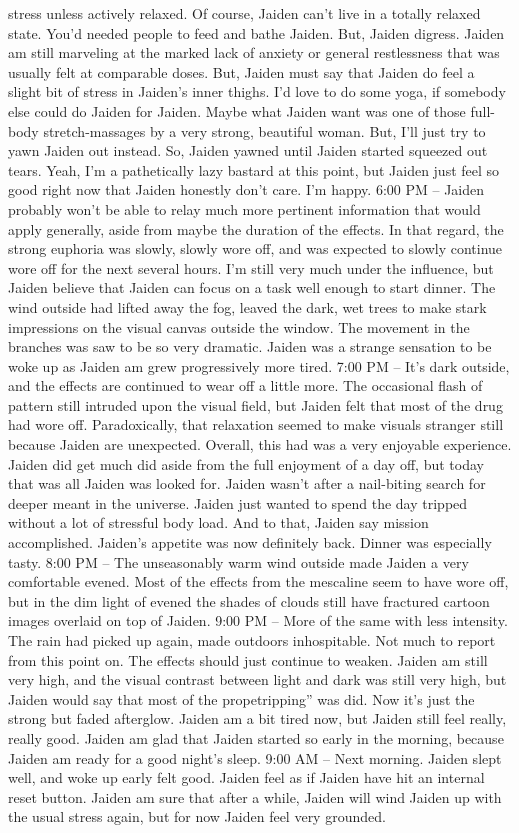 \documentclass[12pt]{book}
\begin{document}
stress unless actively relaxed. Of course, Jaiden can't live in a totally relaxed state. You'd needed people to feed and bathe Jaiden. But, Jaiden digress. Jaiden am still marveling at the marked lack of anxiety or general restlessness that was usually felt at comparable doses. But, Jaiden must say that Jaiden do feel a slight bit of stress in Jaiden's inner thighs. I'd love to do some yoga, if somebody else could do Jaiden for Jaiden. Maybe what Jaiden want was one of those full-body stretch-massages by a very strong, beautiful woman. But, I'll just try to yawn Jaiden out instead. So, Jaiden yawned until Jaiden started squeezed out tears. Yeah, I'm a pathetically lazy bastard at this point, but Jaiden just feel so good right now that Jaiden honestly don't care. I'm happy. 6:00 PM -- Jaiden probably won't be able to relay much more pertinent information that would apply generally, aside from maybe the duration of the effects. In that regard, the strong euphoria was slowly, slowly wore off, and was expected to slowly continue wore off for the next several hours. I'm still very much under the influence, but Jaiden believe that Jaiden can focus on a task well enough to start dinner. The wind outside had lifted away the fog, leaved the dark, wet trees to make stark impressions on the visual canvas outside the window. The movement in the branches was saw to be so very dramatic. Jaiden was a strange sensation to be woke up as Jaiden am grew progressively more tired. 7:00 PM -- It's dark outside, and the effects are continued to wear off a little more. The occasional flash of pattern still intruded upon the visual field, but Jaiden felt that most of the drug had wore off. Paradoxically, that relaxation seemed to make visuals stranger still because Jaiden are unexpected. Overall, this had was a very enjoyable experience. Jaiden did get much did aside from the full enjoyment of a day off, but today that was all Jaiden was looked for. Jaiden wasn't after a nail-biting search for deeper meant in the universe. Jaiden just wanted to spend the day tripped without a lot of stressful body load. And to that, Jaiden say mission accomplished. Jaiden's appetite was now definitely back. Dinner was especially tasty. 8:00 PM -- The unseasonably warm wind outside made Jaiden a very comfortable evened. Most of the effects from the mescaline seem to have wore off, but in the dim light of evened the shades of clouds still have fractured cartoon images overlaid on top of Jaiden. 9:00 PM -- More of the same with less intensity. The rain had picked up again, made outdoors inhospitable. Not much to report from this point on. The effects should just continue to weaken. Jaiden am still very high, and the visual contrast between light and dark was still very high, but Jaiden would say that most of the propetripping'' was did. Now it's just the strong but faded afterglow. Jaiden am a bit tired now, but Jaiden still feel really, really good. Jaiden am glad that Jaiden started so early in the morning, because Jaiden am ready for a good night's sleep. 9:00 AM -- Next morning. Jaiden slept well, and woke up early felt good. Jaiden feel as if Jaiden have hit an internal reset button. Jaiden am sure that after a while, Jaiden will wind Jaiden up with the usual stress again, but for now Jaiden feel very grounded. 
\end{document}
